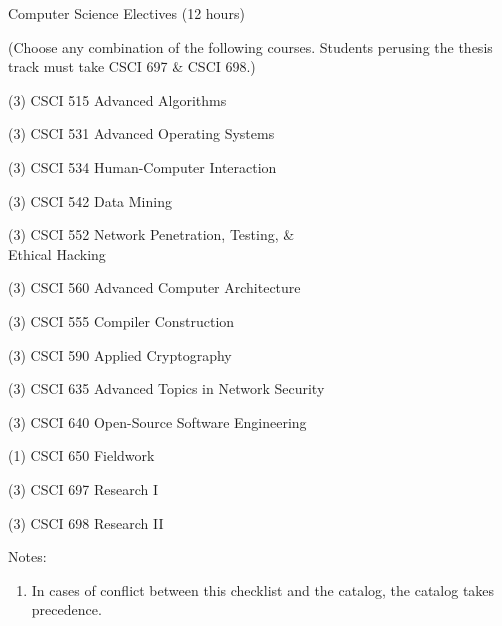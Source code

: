 \begin{reqgroup}{Computer Science Electives (12 hours)}
\begin{center}%
(Choose any combination of the following courses. Students perusing the thesis track must take CSCI 697 \& CSCI 698.)\vspace{-0.5em}%
\end{center}%
\begin{checklist}
\begin{minipage}[t]{0.5\linewidth}
	\item (3) CSCI 515  Advanced Algorithms
	\item (3) CSCI 531  Advanced Operating Systems
	\item (3) CSCI 534  Human-Computer Interaction
	\item (3) CSCI 542  Data Mining
	\item (3) CSCI 552  Network Penetration, Testing, \&\\Ethical Hacking
	\item (3) CSCI 560  Advanced Computer Architecture
	\item (3) CSCI 555  Compiler Construction %
\end{minipage}
\begin{minipage}[t]{0.5\linewidth}
	\item (3) CSCI 590  Applied Cryptography
	\item (3) CSCI 635  Advanced Topics in Network Security
	\item (3) CSCI 640  Open-Source Software Engineering %
	\item (1) CSCI 650  Fieldwork
	\item (3) CSCI 697  Research I
	\item (3) CSCI 698  Research II
\end{minipage}
\end{checklist}
\end{reqgroup}

Notes:%
\begin{enumerate}\footnotesize
	\item In cases of conflict between this checklist and the catalog, the catalog takes precedence.
\end{enumerate}